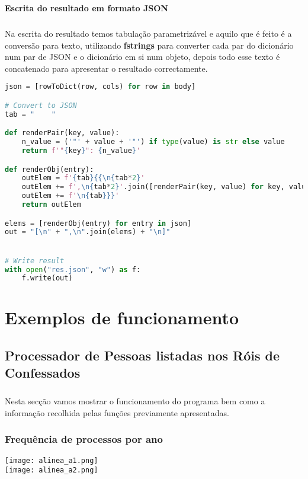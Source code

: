 \documentclass[11pt,a4paper]{report}
\begin{document}
\item \textbf{Escrita do resultado em formato JSON}
\paragraph{}
Na escrita do resultado temos tabulação parametrizável e aquilo que é feito é a conversão para texto, utilizando \textbf{fstrings} para converter cada par do dicionário num par de JSON e o dicionário em si num objeto, depois todo esse texto é concatenado para apresentar o resultado correctamente.

\begin{lstlisting}[language=Python]
json = [rowToDict(row, cols) for row in body]

# Convert to JSON
tab = "    "

def renderPair(key, value):
    n_value = ('"' + value + '"') if type(value) is str else value
    return f'"{key}": {n_value}'

def renderObj(entry):
    outElem = f'{tab}{{\n{tab*2}'
    outElem += f',\n{tab*2}'.join([renderPair(key, value) for key, value in entry.items()])
    outElem += f'\n{tab}}}'
    return outElem

elems = [renderObj(entry) for entry in json]
out = "[\n" + ",\n".join(elems) + "\n]"


# Write result
with open("res.json", "w") as f:
    f.write(out)

\end{lstlisting}
    
    \chapter{Exemplos de funcionamento}
    \section{Processador de Pessoas listadas nos Róis de Confessados}
    \paragraph{}
    Nesta secção vamos mostrar o funcionamento do programa bem como a informação recolhida pelas funções previamente apresentadas.
    \subsection{Frequência de processos por ano}
    \texttt{[image: alinea\_a1.png]} \\
	\texttt{[image: alinea\_a2.png]}
\end{document}
